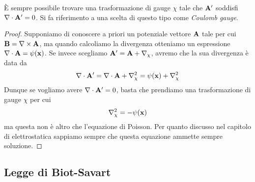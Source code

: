 \begin{theorem}
	\`E sempre possibile trovare una trasformazione di gauge $\chi$ tale che $\bold{A}'$ soddisfi $\nabla \cdot \bold{A}' = 0$. Si fa riferimento a una scelta di questo tipo come \textit{Coulomb gauge}.
\end{theorem}

\begin{proof}
	Supponiamo di conoscere a priori un potenziale vettore $\bold{A}$ tale per cui $\bold{B} = \nabla \times \bold{A}$, ma quando calcoliamo la divergenza otteniamo un espressione $\nabla \cdot \bold{A} = \psi(\bold{x})$. Se invece scegliamo $\bold{A}' = \bold{A} + \nabla_{\chi}$, avremo che la sua divergenza \`e data da 
	\begin{equation*}
		\nabla \cdot \bold{A}' = \nabla \cdot \bold{A} + \nabla^2_{\chi} = \psi(\bold{x}) + \nabla^2_{\chi}
	\end{equation*}
Dunque se vogliamo avere $\nabla \cdot \bold{A}' = 0 $, basta che prendiamo una trasformazione di gauge $\chi$ per cui
\begin{equation*}
	\nabla^2_{\chi} = -\psi(\bold{x})
\end{equation*}
ma questa non \`e altro che l'equazione di Poisson. Per quanto discusso nel capitolo di elettrostatica sappiamo sempre che questa equazione ammette sempre soluzione.

\end{proof}

\newpage 

\subsection{Legge di Biot-Savart}

